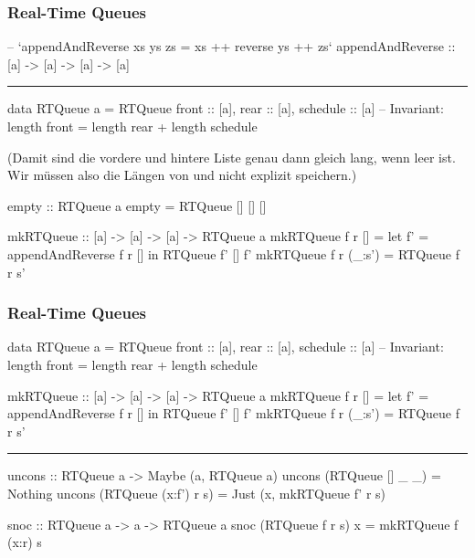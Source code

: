 \documentclass{beamer}
\begin{document}
\begin{frame}[t,fragile]
  \frametitle{Real-Time Queues}
\begin{haskellcode}
-- `appendAndReverse xs ys zs = xs ++ reverse ys ++ zs`
appendAndReverse :: [a] -> [a] -> [a] -> [a]
\end{haskellcode}
{\noindent \color{gray} \rule{\textwidth}{0.4pt}}\begin{haskellcode}
data RTQueue a =
  RTQueue { front :: [a], rear :: [a], schedule :: [a] }
-- Invariant: length front = length rear + length schedule
\end{haskellcode}

  (Damit sind die vordere und hintere Liste genau dann gleich lang, wenn  leer ist.
  Wir müssen also die Längen von  und  nicht explizit speichern.)

\begin{haskellcode}
empty :: RTQueue a
empty = RTQueue [] [] []

mkRTQueue :: [a] -> [a] -> [a] -> RTQueue a
mkRTQueue f r [] = let f' = appendAndReverse f r []
                   in RTQueue f' [] f'
mkRTQueue f r (_:s') = RTQueue f r s'
\end{haskellcode}

\end{frame}

\begin{frame}[t,fragile]
  \frametitle{Real-Time Queues}
\begin{haskellcode}
data RTQueue a =
  RTQueue { front :: [a], rear :: [a], schedule :: [a] }
-- Invariant: length front = length rear + length schedule

mkRTQueue :: [a] -> [a] -> [a] -> RTQueue a
mkRTQueue f r [] = let f' = appendAndReverse f r []
                   in RTQueue f' [] f'
mkRTQueue f r (_:s') = RTQueue f r s'
\end{haskellcode}
{ \noindent \color{gray} \rule{\textwidth}{0.4pt}}\begin{haskellcode}
uncons :: RTQueue a -> Maybe (a, RTQueue a)
uncons (RTQueue [] _ _) = Nothing
uncons (RTQueue (x:f') r s) =
  Just (x, mkRTQueue f' r s)

snoc :: RTQueue a -> a -> RTQueue a
snoc (RTQueue f r s) x = mkRTQueue f (x:r) s
\end{haskellcode}
\end{frame}
\end{document}
